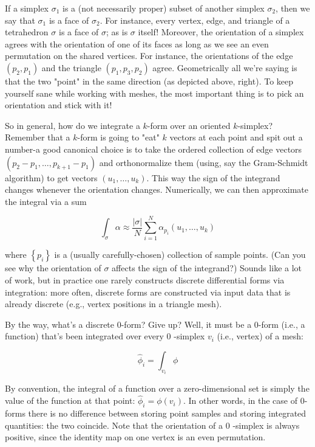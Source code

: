 \documentclass[10pt]{article}
\begin{document}
If a simplex $\sigma_{1}$ is a (not necessarily proper) subset of another simplex $\sigma_{2}$, then we say that $\sigma_{1}$ is a face of $\sigma_{2}$. For instance, every vertex, edge, and triangle of a tetrahedron $\sigma$ is a face of $\sigma$; as is $\sigma$ itself! Moreover, the orientation of a simplex agrees with the orientation of one of its faces as long as we see an even permutation on the shared vertices. For instance, the orientations of the edge $\left(p_{2}, p_{1}\right)$ and the triangle $\left(p_{1}, p_{3}, p_{2}\right)$ agree. Geometrically all we're saying is that the two "point" in the same direction (as depicted above, right). To keep yourself sane while working with meshes, the most important thing is to pick an orientation and stick with it!

So in general, how do we integrate a $k$-form over an oriented $k$-simplex? Remember that a $k$-form is going to "eat" $k$ vectors at each point and spit out a number-a good canonical choice is to take the ordered collection of edge vectors $\left(p_{2}-p_{1}, \ldots, p_{k+1}-p_{1}\right)$ and orthonormalize them (using, say the Gram-Schmidt algorithm) to get vectors $\left(u_{1}, \ldots, u_{k}\right)$. This way the sign of the integrand changes whenever the orientation changes. Numerically, we can then approximate the integral via a sum

$$
\int_{\sigma} \alpha \approx \frac{|\sigma|}{N} \sum_{i=1}^{N} \alpha_{p_{i}}\left(u_{1}, \ldots, u_{k}\right)
$$

where $\left\{p_{i}\right\}$ is a (usually carefully-chosen) collection of sample points. (Can you see why the orientation of $\sigma$ affects the sign of the integrand?) Sounds like a lot of work, but in practice one rarely constructs discrete differential forms via integration: more often, discrete forms are constructed via input data that is already discrete (e.g., vertex positions in a triangle mesh).

By the way, what's a discrete 0-form? Give up? Well, it must be a 0-form (i.e., a function) that's been integrated over every 0 -simplex $v_{i}$ (i.e., vertex) of a mesh:

$$
\hat{\phi}_{i}=\int_{v_{i}} \phi
$$

By convention, the integral of a function over a zero-dimensional set is simply the value of the function at that point: $\hat{\phi}_{i}=\phi\left(v_{i}\right)$. In other words, in the case of 0-forms there is no difference between storing point samples and storing integrated quantities: the two coincide. Note that the orientation of a 0 -simplex is always positive, since the identity map on one vertex is an even permutation.
\end{document}
